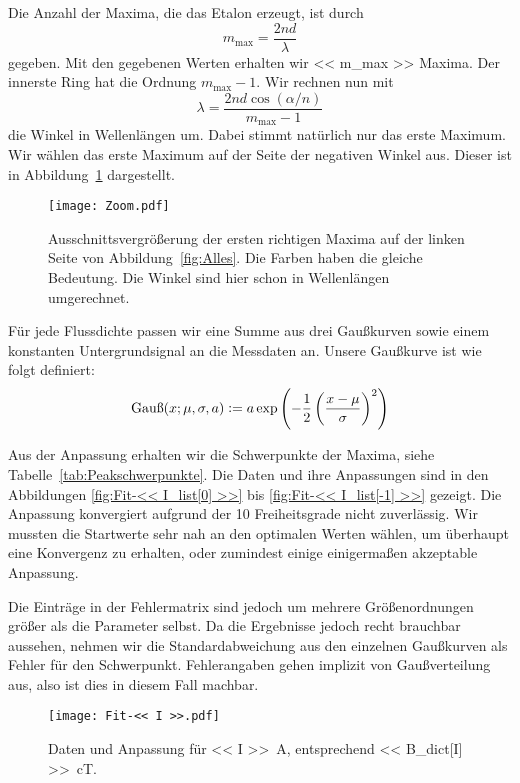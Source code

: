 Die Anzahl der Maxima, die das Etalon erzeugt, ist durch
\[
    m_\text{max} = \frac{2nd}{\lambda}
\]
gegeben. Mit den gegebenen Werten erhalten wir \num{<< m_max >>} Maxima. Der
innerste Ring hat die Ordnung $m_\text{max} - 1$. Wir rechnen nun mit
\[
    \lambda = \frac{2 n d \cos(\alpha/n)}{m_\text{max} - 1}
\]
die Winkel in Wellenlängen um. Dabei stimmt natürlich nur das erste Maximum. Wir
wählen das erste Maximum auf der Seite der negativen Winkel aus. Dieser ist in
Abbildung~\ref{fig:Zoom} dargestellt.

\begin{figure}[htbp]
    \centering
    \texttt{[image: Zoom.pdf]}
    \caption{%
        Ausschnittsvergrößerung der ersten richtigen Maxima auf der linken
        Seite von Abbildung~\ref{fig:Alles}. Die Farben haben die gleiche
        Bedeutung. Die Winkel sind hier schon in Wellenlängen umgerechnet.
    }
    \label{fig:Zoom}
\end{figure}

Für jede Flussdichte passen wir eine Summe aus drei Gaußkurven sowie einem
konstanten Untergrundsignal an die Messdaten an. Unsere Gaußkurve ist wie folgt
definiert:
\begin{equation}
    \label{eq:gauss}
    \mathop{\text{Gauß}} (x; \mu, \sigma, a)
    := a \exp\del{- \frac12 \del{\frac{x-\mu}{\sigma}}^2}
\end{equation}

Aus der Anpassung erhalten wir die Schwerpunkte der Maxima, siehe
Tabelle~\ref{tab:Peakschwerpunkte}. Die Daten und ihre Anpassungen sind in den
Abbildungen \ref{fig:Fit-<< I_list[0] >>} bis \ref{fig:Fit-<< I_list[-1] >>}
gezeigt. Die Anpassung konvergiert aufgrund der 10 Freiheitsgrade nicht
zuverlässig. Wir mussten die Startwerte sehr nah an den optimalen Werten
wählen, um überhaupt eine Konvergenz zu erhalten, oder zumindest einige
einigermaßen akzeptable Anpassung.

Die Einträge in der Fehlermatrix sind jedoch um mehrere Größenordnungen größer
als die Parameter selbst. Da die Ergebnisse jedoch recht brauchbar aussehen,
nehmen wir die Standardabweichung aus den einzelnen Gaußkurven als Fehler für
den Schwerpunkt. Fehlerangaben gehen implizit von Gaußverteilung aus, also ist
dies in diesem Fall machbar.

\begin{figure}[htbp]
    \centering
    \texttt{[image: Fit-<< I >>.pdf]}
    \caption{%
        Daten und Anpassung für \SI{<< I >>}{\ampere}, entsprechend \SI{<<
        B_dict[I] >>}{\centi\tesla}.
    }
    \label{fig:Fit-<< I >>}
\end{figure}

